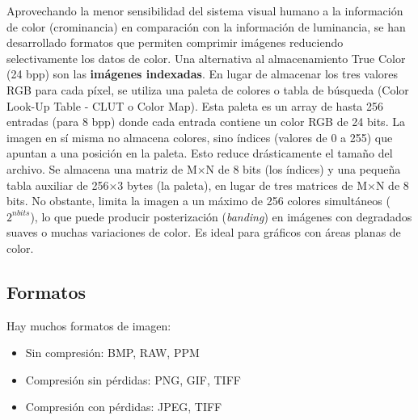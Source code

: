 Aprovechando la menor sensibilidad del sistema visual humano a la información de color (crominancia) en comparación con la información de luminancia, se han desarrollado formatos que permiten comprimir imágenes reduciendo selectivamente los datos de color. Una alternativa al almacenamiento True Color (24 bpp) son las \textbf{imágenes indexadas}. En lugar de almacenar los tres valores RGB para cada píxel, se utiliza una paleta de colores o tabla de búsqueda (Color Look-Up Table - CLUT o Color Map). Esta paleta es un array de hasta 256 entradas (para 8 bpp) donde cada entrada contiene un color RGB de 24 bits.
La imagen en sí misma no almacena colores, sino índices (valores de 0 a 255) que apuntan a una posición en la paleta. Esto reduce drásticamente el tamaño del archivo. Se almacena una matriz de M×N de 8 bits (los índices) y una pequeña tabla auxiliar de 256×3 bytes (la paleta), en lugar de tres matrices de M×N de 8 bits.
No obstante, limita la imagen a un máximo de 256 colores simultáneos ($2^{nbits}$), lo que puede producir posterización (\textit{banding}) en imágenes con degradados suaves o muchas variaciones de color. Es ideal para gráficos con áreas planas de color.

\subsection{Formatos}
Hay muchos formatos de imagen:
\begin{itemize}
\item Sin compresión: BMP, RAW, PPM
\item Compresión sin pérdidas: PNG, GIF, TIFF
\item Compresión con pérdidas: JPEG, TIFF
\end{itemize}
